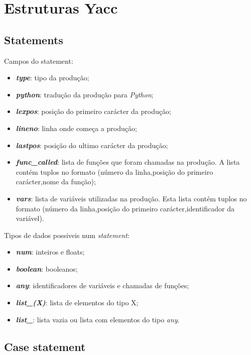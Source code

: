 \documentclass[11pt,a4paper]{report}
\begin{document}
\chapter{Estruturas Yacc}
\label{appendix:estruturas_yacc}

\section{Statements}

Campos do statement:
\begin{itemize}
    \item \textbf{\textit{type}}: tipo da produção; 
    \item \textbf{\textit{python}}: tradução da produção para \textit{Python};
    \item \textbf{\textit{lexpos}}: posição do primeiro carácter da produção;
    \item \textbf{\textit{lineno}}: linha onde começa a produção;
    \item \textbf{\textit{lastpos}}: posição do ultimo carácter da produção;
    \item \textbf{\textit{func\_called}}: lista de funções que foram chamadas na produção. A lista contém tuplos no formato (número da linha,posição do primeiro carácter,nome da função);
    \item \textbf{\textit{vars}}: lista de variáveis utilizadas na produção. Esta lista contém tuplos no formato (número da linha,posição do primeiro carácter,identificador da variável).
    
\end{itemize} 

Tipos de dados possiveis num \textit{statement}:

\begin{itemize}
  \item \textbf{\textit{num}}: inteiros e floats;
  \item \textbf{\textit{boolean}}: booleanos;
  \item \textbf{\textit{any}}: identificadores de variáveis e chamadas de funções;
  \item \textbf{\textit{list\_(X)}}: lista de elementos do tipo X;
  \item \textbf{\textit{list\_}}: lista vazia ou lista com elementos do tipo \textit{any}.
\end{itemize}

\section{Case statement}
\end{document}
